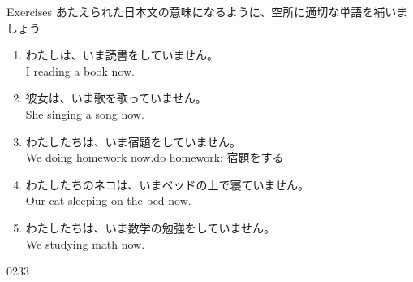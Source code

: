 \documentclass[aspectratio=169,xcolor={dvipsnames,table}]{beamer}
\newcommand{\myaudio}[1]{\href{#1}{\faVolumeUp}}
\begin{document}
\begin{frame}[plain]{Exercises}
あたえられた日本文の意味になるように、空所に適切な単語を補いましょう

\begin{enumerate}
 \item わたしは、いま読書をしていません。\\
I  reading a book now.
 \item 彼女は、いま歌を歌っていません。\\
She  singing a song now.
 \item わたしたちは、いま宿題をしていません。\\
We  doing homework now.\hfill{\scriptsize do homework: 宿題をする}
 \item わたしたちのネコは、いまベッドの上で寝ていません。\\
Our cat  sleeping on the bed now.
 \item わたしたちは、いま数学の勉強をしていません。\\
We  studying math now.
\end{enumerate} 

\hfill{\tiny 0233}\,{\scriptsize \myaudio{./audio/022_is_ing_negative_02.mp3}}
\end{frame}
\end{document}
